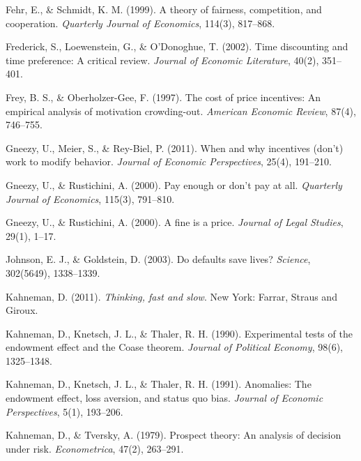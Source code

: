 \documentclass[11pt,a4paper]{article}
\begin{document}
\vspace{0.3cm}
Fehr, E., \& Schmidt, K. M. (1999). A theory of fairness, competition, and cooperation. \textit{Quarterly Journal of Economics}, 114(3), 817--868.

\vspace{0.3cm}
Frederick, S., Loewenstein, G., \& O'Donoghue, T. (2002). Time discounting and time preference: A critical review. \textit{Journal of Economic Literature}, 40(2), 351--401.

\vspace{0.3cm}
Frey, B. S., \& Oberholzer-Gee, F. (1997). The cost of price incentives: An empirical analysis of motivation crowding-out. \textit{American Economic Review}, 87(4), 746--755.

\vspace{0.3cm}
Gneezy, U., Meier, S., \& Rey-Biel, P. (2011). When and why incentives (don't) work to modify behavior. \textit{Journal of Economic Perspectives}, 25(4), 191--210.

\vspace{0.3cm}
Gneezy, U., \& Rustichini, A. (2000). Pay enough or don't pay at all. \textit{Quarterly Journal of Economics}, 115(3), 791--810.

\vspace{0.3cm}
Gneezy, U., \& Rustichini, A. (2000). A fine is a price. \textit{Journal of Legal Studies}, 29(1), 1--17.

\vspace{0.3cm}
Johnson, E. J., \& Goldstein, D. (2003). Do defaults save lives? \textit{Science}, 302(5649), 1338--1339.

\vspace{0.3cm}
Kahneman, D. (2011). \textit{Thinking, fast and slow}. New York: Farrar, Straus and Giroux.

\vspace{0.3cm}
Kahneman, D., Knetsch, J. L., \& Thaler, R. H. (1990). Experimental tests of the endowment effect and the Coase theorem. \textit{Journal of Political Economy}, 98(6), 1325--1348.

\vspace{0.3cm}
Kahneman, D., Knetsch, J. L., \& Thaler, R. H. (1991). Anomalies: The endowment effect, loss aversion, and status quo bias. \textit{Journal of Economic Perspectives}, 5(1), 193--206.

\vspace{0.3cm}
Kahneman, D., \& Tversky, A. (1979). Prospect theory: An analysis of decision under risk. \textit{Econometrica}, 47(2), 263--291.
\end{document}
